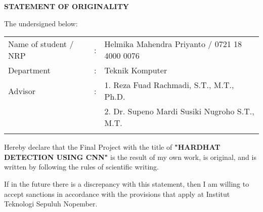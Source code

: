 \begin{center}
  \large
  \textbf{STATEMENT OF ORIGINALITY}
\end{center}

\thispagestyle{empty}

\vspace{2ex}


\noindent The undersigned below:

\begingroup
\setlength{\tabcolsep}{0pt}
\noindent
\begin{tabularx}{\textwidth}{l >{\centering}m{2em} X}
 \\
 Name of student / NRP & : & Helmika Mahendra Priyanto / 0721 18 4000 0076  \\
 Department        & : & Teknik Komputer              \\
 Advisor   & : & 1. Reza Fuad Rachmadi, S.T., M.T., Ph.D.   \\
                    &   & 2. Dr. Supeno Mardi Susiki Nugroho S.T., M.T.\\
 \\
\end{tabularx}
\endgroup



Hereby declare that the Final Project with the title of \textbf{"HARDHAT DETECTION USING CNN"} is the result of my own work, is original, and is written by following the rules of scientific writing.

If in the future there is a discrepancy with this statement, then I am willing to accept sanctions in accordance with the provisions that apply at Institut Teknologi Sepuluh Nopember.

\vspace{8ex}

